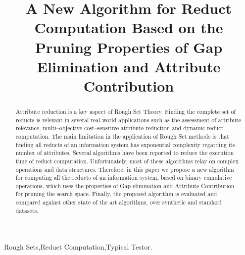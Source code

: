 \documentclass[authoryear,preprint,review,12pt]{elsarticle}
\begin{document}
	
	\title{A New Algorithm for Reduct Computation Based on the Pruning Properties of Gap Elimination 
		   and Attribute Contribution}
		
	
	\address{Computer Science Department\\National Institute of
	Astrophysics, Optics and Electronics\\
	Luis Enrique Erro \# 1, Santa Mar\'{\i}a Tonantzintla, Puebla,
	72840, M\'{e}xico} 
	
	\begin{abstract}
		Attribute reduction is a key aspect of Rough Set Theory.  Finding the complete set of reducts is relevant 
		in several real-world applications such as the assessment of attribute relevance, multi--objective 
		cost--sensitive attribute reduction and dynamic reduct computation. The main limitation in the application
		of Rough Set methods is that finding all reducts of an information system has exponential complexity 
		regarding its number of attributes. Several algorithms have been reported to reduce the execution time
		of reduct computation. Unfortunately, most of these algorithms relay on complex operations and data
		structures. Therefore, in this paper we propose a new algorithm for computing all the reducts of an
		information system, based on binary cumulative operations, which uses the properties of Gap 
		elimination and Attribute Contribution for pruning the search space. Finally, the proposed algorithm is
		evaluated and compared against other state of the art algorithms, over synthetic and standard datasets.
	\end{abstract}
	
	\begin{keyword}
		Rough Sets\sep Reduct Computation\sep Typical Testor.
	\end{keyword}

	\maketitle

\end{document}
